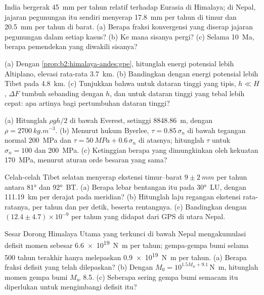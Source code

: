 \begin{exercise}[$\star\star$]\label{exo:b2:himalaya-andes:5}
India bergerak \qty{45}{mm} per tahun relatif terhadap Eurasia di Himalaya; di Nepal,
jajaran pegunungan itu sendiri menyerap \qty{17.8}{mm} per tahun di timur dan \qty{20.5}{mm} per tahun di barat.
(a) Berapa fraksi konvergensi yang diserap jajaran pegunungan dalam setiap kasus? (b) Ke mana
sisanya pergi? (c) Selama \qty{10}{Ma}, berapa pemendekan yang diwakili sisanya?
\end{exercise}

\begin{exercise}[$\star\star$]\label{exo:b2:himalaya-andes:6}
(a) Dengan \cref{prop:b2:himalaya-andes:gpe}, hitunglah energi potensial lebih
Altiplano, elevasi rata-rata \qty{3.7}{km}. (b) Bandingkan dengan energi potensial lebih Tibet pada \qty{4.8}{km}.
(c) Tunjukkan bahwa untuk dataran tinggi yang tipis, $h \ll H$, $\Delta F$ tumbuh sebanding dengan $h$, dan untuk
dataran tinggi yang tebal lebih cepat: apa artinya bagi pertumbuhan dataran tinggi?
\end{exercise}

\begin{exercise}[$\star\star$]\label{exo:b2:himalaya-andes:7}
(a) Hitunglah $\rho g h/2$ di bawah Everest, setinggi \qty{8848.86}{m}, dengan $\rho =
\qty{2700}{kg.m^{-3}}$. (b) Menurut hukum Byerlee, $\tau = 0.85\,\sigma_n$ di bawah tegangan normal \qty{200}{MPa}
dan $\tau = \qty{50}{MPa} + 0.6\,\sigma_n$ di atasnya; hitunglah $\tau$ untuk $\sigma_n =
100$ dan \qty{200}{MPa}. (c) Ketinggian berapa yang dimungkinkan oleh kekuatan \qty{170}{MPa}, menurut aturan
orde besaran yang sama?
\end{exercise}

\begin{exercise}[$\star\star$]\label{exo:b2:himalaya-andes:8}
Celah-celah Tibet selatan menyerap ekstensi timur--barat $9 \pm \qty{2}{mm}$ per tahun antara
\ang{81} dan \ang{92}~BT. (a) Berapa lebar bentangan itu pada \ang{30}~LU, dengan \qty{111.19}{km} per
derajat pada meridian? (b) Hitunglah laju regangan ekstensi rata-ratanya, per tahun dan per detik,
beserta rentangnya. (c) Bandingkan dengan $(12.4 \pm 4.7) \times 10^{-9}$ per tahun yang didapat dari GPS di utara Nepal.
\end{exercise}

\begin{exercise}[$\star\star$]\label{exo:b2:himalaya-andes:9}
Sesar Dorong Himalaya Utama yang terkunci di bawah Nepal mengakumulasi defisit momen sebesar
\qty{6.6e19}{N.m} per tahun; gempa-gempa bumi selama 500 tahun terakhir hanya melepaskan
\qty{0.9e19}{N.m} per tahun. (a) Berapa fraksi defisit yang telah dilepaskan? (b) Dengan $M_0 =
10^{1.5 M_w + 9.1}$\,\unit{N.m}, hitunglah momen gempa bumi $M_w$ 8.5. (c) Seberapa sering
gempa bumi semacam itu diperlukan untuk mengimbangi defisit itu?
\end{exercise}

